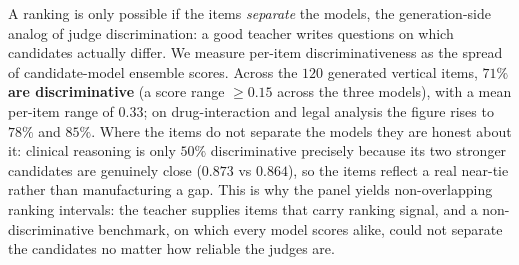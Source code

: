 A ranking is only possible if the items \emph{separate} the models, the generation-side analog of judge
discrimination: a good teacher writes questions on which candidates actually differ. We measure per-item
discriminativeness as the spread of candidate-model ensemble scores. Across the \(120\) generated vertical items,
\textbf{\(71\%\) are discriminative} (a score range \(\ge 0.15\) across the three models), with a mean per-item
range of \(0.33\); on drug-interaction and legal analysis the figure rises to \(78\%\) and \(85\%\). Where the items do not
separate the models they are honest about it: clinical reasoning is only \(50\%\) discriminative precisely because its
two stronger candidates are genuinely close (\(0.873\) vs \(0.864\)), so the items reflect a real near-tie rather than
manufacturing a gap. This is why the panel yields non-overlapping ranking intervals: the teacher supplies items that
carry ranking signal, and a non-discriminative benchmark, on which every model scores alike, could not separate the
candidates no matter how reliable the judges are.

